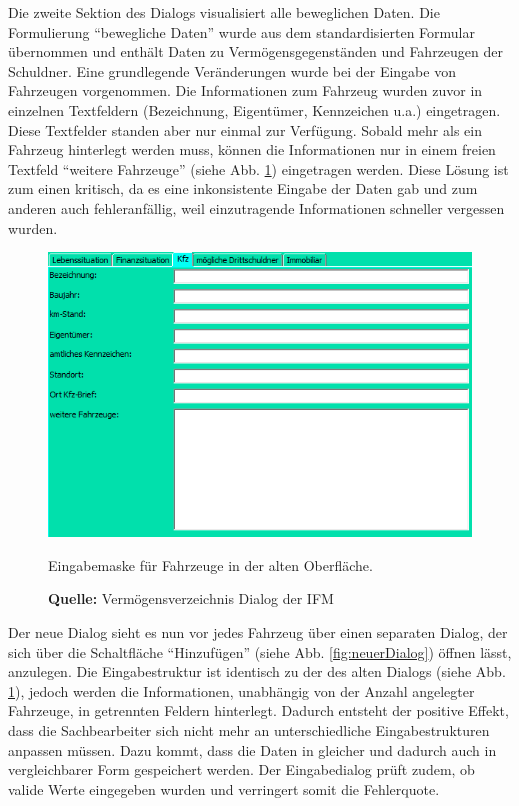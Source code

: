 Die zweite Sektion des Dialogs visualisiert alle beweglichen Daten. Die Formulierung \enquote{bewegliche Daten} wurde aus dem standardisierten Formular übernommen und enthält Daten zu Vermögensgegenständen und Fahrzeugen der Schuldner. Eine grundlegende Veränderungen wurde bei der Eingabe von Fahrzeugen vorgenommen. Die Informationen zum Fahrzeug wurden zuvor in einzelnen Textfeldern (Bezeichnung, Eigentümer, Kennzeichen u.a.) eingetragen. Diese Textfelder standen aber nur einmal zur Verfügung. Sobald mehr als ein Fahrzeug hinterlegt werden muss, können die Informationen nur in einem freien Textfeld \enquote{weitere Fahrzeuge} (siehe Abb. \ref{fig:fahrzeugTab}) eingetragen werden. Diese Lösung ist zum einen kritisch, da es eine inkonsistente Eingabe der Daten gab und zum anderen auch fehleranfällig, weil einzutragende Informationen schneller vergessen wurden.
\begin{figure}[H]
  \centering
  \includegraphics[scale=0.81]{img/FahrzeugTab.PNG}
  \caption{Eingabemaske für Fahrzeuge in der alten Oberfläche.}
    \caption*{\textbf{Quelle:} Vermögensverzeichnis Dialog der IFM}
  \label{fig:fahrzeugTab}
\end{figure}
Der neue Dialog sieht es nun vor jedes Fahrzeug über einen separaten Dialog, der sich über die Schaltfläche \enquote{Hinzufügen} (siehe Abb. \ref{fig:neuerDialog}) öffnen lässt, anzulegen. Die Eingabestruktur ist identisch zu der des alten Dialogs (siehe Abb. \ref{fig:fahrzeugTab}), jedoch werden die Informationen, unabhängig von der Anzahl angelegter Fahrzeuge, in getrennten Feldern hinterlegt. Dadurch entsteht der positive Effekt, dass die Sachbearbeiter sich nicht mehr an unterschiedliche Eingabestrukturen anpassen müssen. Dazu kommt, dass die Daten in gleicher und dadurch auch in vergleichbarer Form gespeichert werden. Der Eingabedialog prüft zudem, ob valide Werte eingegeben wurden und verringert somit die Fehlerquote.
